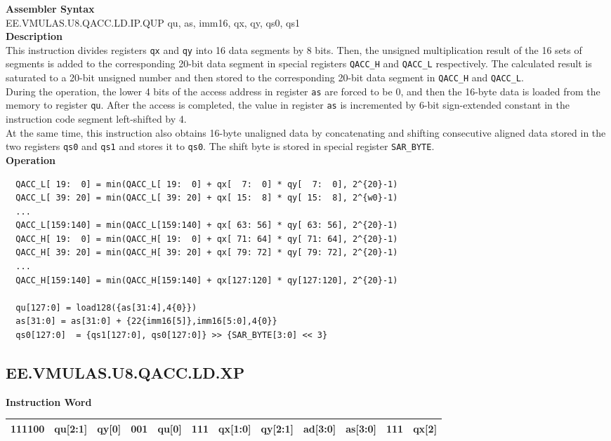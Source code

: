 \textbf{Assembler Syntax} \\
EE.VMULAS.U8.QACC.LD.IP.QUP qu, as, imm16, qx, qy, qs0, qs1 \\
\textbf{Description} \\
This instruction divides registers \lstinline{qx} and \lstinline{qy} into 16 data segments by 8 bits. Then, the unsigned multiplication result of the 16 sets of segments is added to the corresponding 20-bit data segment in special registers \lstinline{QACC_H} and \lstinline{QACC_L} respectively. The calculated result is saturated to a 20-bit unsigned number and then stored to the corresponding 20-bit data segment in \lstinline{QACC_H} and \lstinline{QACC_L}.\\
During the operation, the lower 4 bits of the access address in register \lstinline{as} are forced to be 0, and then the 16-byte data is loaded from the memory to register \lstinline{qu}. After the access is completed, the value in register \lstinline{as} is incremented by 6-bit sign-extended constant in the instruction code segment left-shifted by 4.\\
At the same time, this instruction also obtains 16-byte unaligned data by concatenating and shifting consecutive aligned data stored in the two registers \lstinline{qs0} and \lstinline{qs1} and stores it to \lstinline{qs0}. The shift byte is stored in special register \lstinline{SAR_BYTE}.\\
\textbf{Operation}
\begin{lstlisting}
  QACC_L[ 19:  0] = min(QACC_L[ 19:  0] + qx[  7:  0] * qy[  7:  0], 2^{20}-1)
  QACC_L[ 39: 20] = min(QACC_L[ 39: 20] + qx[ 15:  8] * qy[ 15:  8], 2^{w0}-1)
  ...
  QACC_L[159:140] = min(QACC_L[159:140] + qx[ 63: 56] * qy[ 63: 56], 2^{20}-1)
  QACC_H[ 19:  0] = min(QACC_H[ 19:  0] + qx[ 71: 64] * qy[ 71: 64], 2^{20}-1)
  QACC_H[ 39: 20] = min(QACC_H[ 39: 20] + qx[ 79: 72] * qy[ 79: 72], 2^{20}-1)
  ...
  QACC_H[159:140] = min(QACC_H[159:140] + qx[127:120] * qy[127:120], 2^{20}-1)

  qu[127:0] = load128({as[31:4],4{0}})
  as[31:0] = as[31:0] + {22{imm16[5]},imm16[5:0],4{0}}
  qs0[127:0]  = {qs1[127:0], qs0[127:0]} >> {SAR_BYTE[3:0] << 3}
\end{lstlisting}

\clearpage
\subsection{EE.VMULAS.U8.QACC.LD.XP}\label{instruction:EEVMULASU8QACCLDXP}
\setlength\tabcolsep{6pt}
\textbf{Instruction Word} \\
\begin{tabular}{|c|c|c|c|c|c|c|c|c|c|c|c|}
	\hline
	111100 & qu[2:1] & qy[0] & 001 & qu[0] & 111 & qx[1:0] & qy[2:1] & ad[3:0] & as[3:0] & 111 & qx[2] \\
	\hline
\end{tabular}

